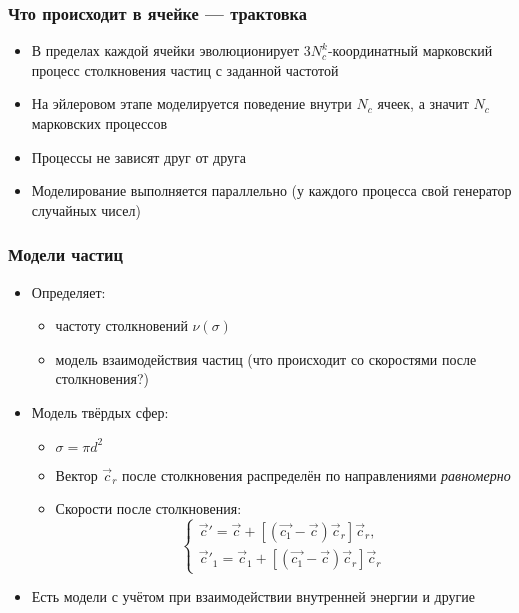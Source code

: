 \documentclass[onlymath]{beamer}
\begin{document}
\begin{frame}
  \frametitle{Что происходит в ячейке — трактовка}
  \begin{itemize}
  \item В пределах каждой ячейки эволюционирует $3 N_c^k$-координатный
    марковский процесс столкновения частиц с заданной частотой
  \item На эйлеровом этапе моделируется поведение внутри $N_c$ ячеек,
    а значит $N_c$ марковских процессов
  \item Процессы не зависят друг от друга
  \item Моделирование выполняется параллельно (у каждого процесса свой
    генератор случайных чисел)
  \end{itemize}
\end{frame}

\begin{frame}
  \frametitle{Модели частиц}
  \begin{itemize}
  \item Определяет:
    \begin{itemize}
    \item частоту столкновений $\nu(\sigma)$
    \item модель взаимодействия частиц (что
      происходит со скоростями после столкновения?)
    \end{itemize}
  \item Модель твёрдых сфер:
    \begin{itemize}
    \item $\sigma = \pi d^2$
    \item Вектор $\vec{c}_r$ после столкновения распределён по
      направлениями \emph{равномерно}
    \item Скорости после столкновения:
      \begin{equation*}
        \begin{cases}
          \vec{c}' = \vec{c} + [(\vec{c_1} - \vec{c})\vec{c}_r]\vec{c}_r,\\
          \vec{c}'_1 = \vec{c}_1 + [(\vec{c_1} - \vec{c})\vec{c}_r]\vec{c}_r
        \end{cases}
      \end{equation*}
    \end{itemize}
  \item Есть модели с учётом при взаимодействии внутренней энергии и
    другие
  \end{itemize}
\end{frame}
\end{document}
